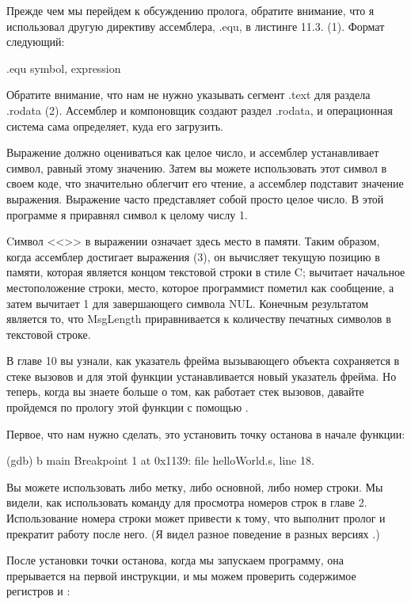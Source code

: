 Прежде чем мы перейдем к обсуждению пролога, обратите внимание, что я использовал другую директиву ассемблера, .equ, в листинге 11.3. (1). Формат следующий:

\begin{ffcode}
.equ symbol, expression
\end{ffcode}

Обратите внимание, что нам не нужно указывать сегмент .text для раздела .rodata (2). Ассемблер и компоновщик создают раздел .rodata, и операционная система сама определяет, куда его загрузить.

Выражение должно оцениваться как целое число, и ассемблер устанавливает символ, равный этому значению. Затем вы можете использовать этот символ в своем коде, что значительно облегчит его чтение, а ассемблер подставит значение выражения. Выражение часто представляет собой просто целое число. В этой программе я приравнял символ  к целому числу 1.

Cимвол <<>> в выражении означает здесь место в памяти. Таким образом, когда ассемблер достигает выражения (3), он вычисляет текущую позицию в памяти, которая является концом текстовой строки в стиле C; вычитает начальное местоположение строки, место, которое программист пометил как сообщение, а затем вычитает 1 для завершающего символа NUL. Конечным результатом является то, что MsgLength приравнивается к количеству печатных символов в текстовой строке.

В главе 10 вы узнали, как указатель фрейма вызывающего объекта сохраняется в стеке вызовов и для этой функции устанавливается новый указатель фрейма. Но теперь, когда вы знаете больше о том, как работает стек вызовов, давайте пройдемся по прологу этой функции с помощью .

Первое, что нам нужно сделать, это установить точку останова в начале функции:

\begin{ffcode}
    (gdb) b main
    Breakpoint 1 at 0x1139: file helloWorld.s, line 18.
\end{ffcode}

Вы можете использовать либо метку, либо основной, либо номер строки. Мы видели, как использовать команду  для просмотра номеров строк в главе 2. Использование номера строки может привести к тому, что  выполнит пролог и прекратит работу после него. (Я видел разное поведение в разных версиях .)

После установки точки останова, когда мы запускаем программу, она прерывается на первой инструкции, и мы можем проверить содержимое регистров  и :

